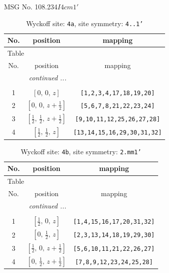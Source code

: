 \documentclass[fleqn,8pt]{jsarticle}
\begin{document}
\setcounter{MaxMatrixCols}{32}

\renewcommand{\tablename}{Table~}
\renewcommand{\figurename}{Figure~}
\begin{center}
\LARGE
MSG No. 108.234\quad$I4cm1'$
\end{center}
\renewcommand{\arraystretch}{1.2}
\begin{longtable}{ccc}
\caption{Wyckoff site: {\tt 4a}, site symmetry: {\tt 4..1'}}
 \\
 \hline \hline
No. & position & mapping \\ \hline \endfirsthead

\multicolumn{2}{l}{\tablename\ \thetable{}} \\
 \hline \hline
No. & position & mapping \\ \hline \endhead

 \hline \hline
\multicolumn{2}{r}{\footnotesize\it continued ...} \\ \endfoot

 \hline \hline
\multicolumn{2}{r}{} \\ \endlastfoot

1 & $\left[ 0,\, 0,\, z \right]$ & {\tt [1,2,3,4,17,18,19,20]} \\ \hline
2 & $\left[ 0,\, 0,\, z + \frac{1}{2} \right]$ & {\tt [5,6,7,8,21,22,23,24]} \\ \hline
3 & $\left[ \frac{1}{2},\, \frac{1}{2},\, z + \frac{1}{2} \right]$ & {\tt [9,10,11,12,25,26,27,28]} \\ \hline
4 & $\left[ \frac{1}{2},\, \frac{1}{2},\, z \right]$ & {\tt [13,14,15,16,29,30,31,32]} \\
\end{longtable}
\renewcommand{\arraystretch}{1.2}
\begin{longtable}{ccc}
\caption{Wyckoff site: {\tt 4b}, site symmetry: {\tt 2.mm1'}}
 \\
 \hline \hline
No. & position & mapping \\ \hline \endfirsthead

\multicolumn{2}{l}{\tablename\ \thetable{}} \\
 \hline \hline
No. & position & mapping \\ \hline \endhead

 \hline \hline
\multicolumn{2}{r}{\footnotesize\it continued ...} \\ \endfoot

 \hline \hline
\multicolumn{2}{r}{} \\ \endlastfoot

1 & $\left[ \frac{1}{2},\, 0,\, z \right]$ & {\tt [1,4,15,16,17,20,31,32]} \\ \hline
2 & $\left[ 0,\, \frac{1}{2},\, z \right]$ & {\tt [2,3,13,14,18,19,29,30]} \\ \hline
3 & $\left[ \frac{1}{2},\, 0,\, z + \frac{1}{2} \right]$ & {\tt [5,6,10,11,21,22,26,27]} \\ \hline
4 & $\left[ 0,\, \frac{1}{2},\, z + \frac{1}{2} \right]$ & {\tt [7,8,9,12,23,24,25,28]} \\
\end{longtable}
\end{document}
